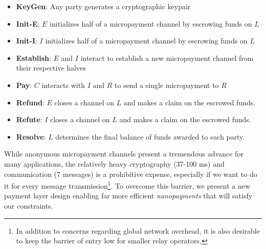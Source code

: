 \begin{itemize}
\item \textbf{KeyGen}: Any party generates a cryptographic keypair
\item \textbf{Init-E}: $E$ initializes half of a micropayment channel by
  escrowing funds on $L$
\item \textbf{Init-I}: $I$ initializes half of a micropayment channel by
  escrowing funds on $L$
\item \textbf{Establish}: $E$ and $I$ interact to establish a new micropayment
  channel from their respective halves
\item \textbf{Pay}: $C$ interacts with $I$ and $R$ to send a single micropayment to $R$
\item \textbf{Refund}: $E$ closes a channel on $L$ and makes a claim on
  the escrowed funds.
\item \textbf{Refute}: $I$ closes a channel on $L$ and makes a claim on
  the escrowed funds.
\item \textbf{Resolve}: $L$ determines the final balance of funds awarded to
  each party.
\end{itemize}

While anonymous micropayment channels present a tremendous advance for many applications, the relatively heavy cryptography (37-100 ms) and communication (7 messages) is a prohibitive expense, especially if we want to do it for every message transmission\footnote{In addition to concerns regarding global network overhead, it is also desirable to keep the barrier of entry low for smaller relay operators.}.
To overcome this barrier, we present a new payment layer design enabling far more efficient \emph{nanopayments} that will satisfy our constraints.

